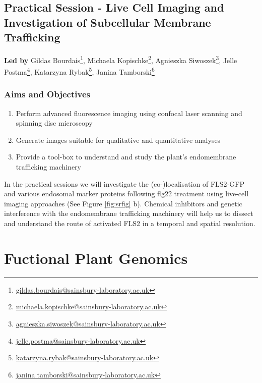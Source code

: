 \documentclass[12pt,]{book}
\providecommand{\tightlist}{%
  \setlength{\itemsep}{0pt}\setlength{\parskip}{0pt}}
\let\rmarkdownfootnote\footnote%
\def\footnote{\protect\rmarkdownfootnote}
\renewcommand{\href}[2]{#2\footnote{\url{#1}}}
\theoremstyle{definition}
\theoremstyle{definition}
\theoremstyle{remark}
\begin{document}
\section*{Practical Session - Live Cell Imaging and Investigation of
Subcellular Membrane
Trafficking}\label{practical-session---live-cell-imaging-and-investigation-of-subcellular-membrane-trafficking}

\textbf{Led by} \href{gildas.bourdais@sainsbury-laboratory.ac.uk}{Gildas
Bourdais}, \href{michaela.kopischke@sainsbury-laboratory.ac.uk}{Michaela
Kopischke},
\href{agnieszka.siwoszek@sainsbury-laboratory.ac.uk}{Agnieszka
Siwoszek}, \href{jelle.postma@sainsbury-laboratory.ac.uk}{Jelle Postma},
\href{katarzyna.rybak@sainsbury-laboratory.ac.uk}{Katarzyna Rybak},
\href{janina.tamborski@sainsbury-laboratory.ac.uk}{Janina Tamborski}

\subsection*{Aims and Objectives}\label{aims-and-objectives-4}

\begin{enumerate}
\def\labelenumi{\arabic{enumi}.}
\tightlist
\item
  Perform advanced fluorescence imaging using confocal laser scanning
  and spinning disc microscopy
\item
  Generate images suitable for qualitative and quantitative analyses
\item
  Provide a tool-box to understand and study the plant's endomembrane
  trafficking machinery
\end{enumerate}

In the practical sessions we will investigate the (co-)localisation of
FLS2-GFP and various endosomal marker proteins following flg22 treatment
using live-cell imaging approaches (See Figure \ref{fig:srfig} b).
Chemical inhibitors and genetic interference with the endomembrane
trafficking machinery will help us to dissect and understand the route
of activated FLS2 in a temporal and spatial resolution.

\chapter*{Fuctional Plant Genomics}\label{fuctional-plant-genomics}
\end{document}
